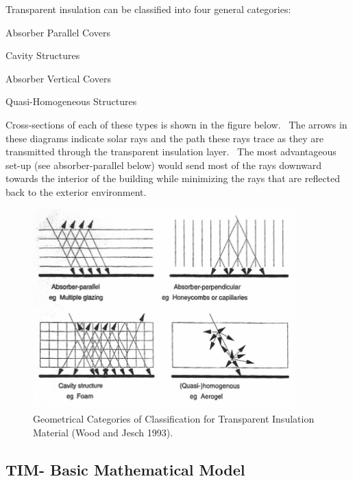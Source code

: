 Transparent insulation can be classified into four general categories:

Absorber Parallel Covers

Cavity Structures

Absorber Vertical Covers

Quasi-Homogeneous Structures

Cross-sections of each of these types is shown in the figure below.~ The arrows in these diagrams indicate solar rays and the path these rays trace as they are transmitted through the transparent insulation layer.~ The most advantageous set-up (see absorber-parallel below) would send most of the rays downward towards the interior of the building while minimizing the rays that are reflected back to the exterior environment.

\begin{figure}[hbtp] %
\centering
\includegraphics[width=0.9\textwidth, height=0.9\textheight, keepaspectratio=true]{media/image400.png}
\caption{Geometrical Categories of Classification for Transparent Insulation Material (Wood and Jesch 1993). \protect \label{fig:geometrical-categories-of-classification-for}}
\end{figure}

\subsection{TIM- Basic Mathematical Model}\label{tim--basic-mathematical-model}

